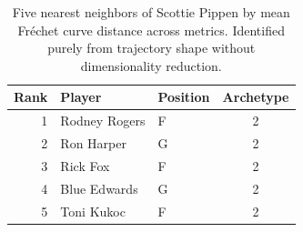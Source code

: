 \begin{table}[htbp]
  \centering\small
  \begin{tabular}{rllc}
    \toprule
    Rank & Player & Position & Archetype \\
    \midrule
    1 & Rodney Rogers & F & 2 \\
    2 & Ron Harper & G & 2 \\
    3 & Rick Fox & F & 2 \\
    4 & Blue Edwards & G & 2 \\
    5 & Toni Kukoc & F & 2 \\
    \bottomrule
  \end{tabular}
  \caption{Five nearest neighbors of Scottie Pippen by mean Fr\'{e}chet curve distance across metrics. Identified purely from trajectory shape without dimensionality reduction.}
  \label{tab:Scottie_Pippen_frechet_curve_neighbors}
\end{table}

